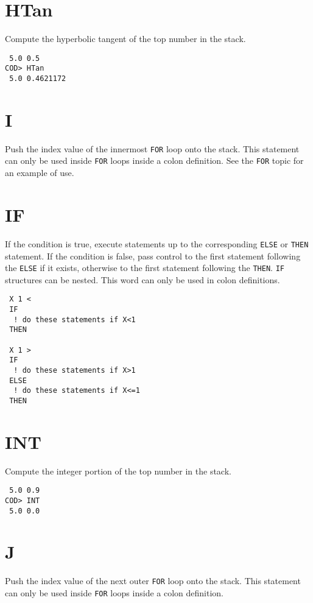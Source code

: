 \section*{HTan}
Compute the hyperbolic tangent of the top number in the stack.

\medskip
{}
\begin{verbatim}
 5.0 0.5
COD> HTan
 5.0 0.4621172
\end{verbatim}

\section*{I}
Push the index value of the innermost {\tt FOR} loop onto the stack.
This statement can only be used inside {\tt FOR} loops inside
a colon definition.
See the {\tt FOR} topic for an example of use.

\section*{IF}
If the condition is true,
execute statements up to the corresponding {\tt ELSE} or {\tt THEN} statement.
If the condition is false,
pass control to the first statement following the {\tt ELSE} if it exists,
otherwise to the first statement following the {\tt THEN}\@.
{\tt IF} structures can be nested.
This word can only be used in colon definitions.

\medskip
{}
\begin{verbatim}
 X 1 <
 IF
  ! do these statements if X<1
 THEN

 X 1 >
 IF
  ! do these statements if X>1
 ELSE
  ! do these statements if X<=1
 THEN
\end{verbatim}

\section*{INT}
Compute the integer portion of the top number in the stack.

\medskip
{}
\begin{verbatim}
 5.0 0.9
COD> INT
 5.0 0.0
\end{verbatim}

\section*{J}
Push the index value of the next outer {\tt FOR} loop onto the stack.
This statement can only be used inside {\tt FOR} loops inside
a colon definition.

